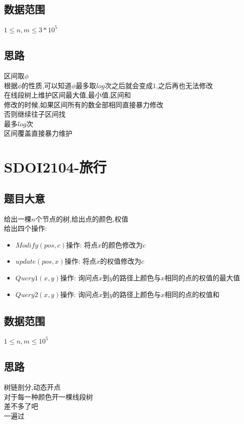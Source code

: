 \documentclass{ctexart}
\numberwithin{equation}{section}
\begin{document}
\begin{flushleft}
  \subsection{数据范围}
  $1\le n,m\le 3*10^5$\\
  \subsection{思路}
  区间取$\phi$\\
  根据$\phi$的性质,可以知道$\phi$最多取$log$次之后就会变成$1$,之后再也无法修改\\
  在线段树上维护区间最大值,最小值,区间和\\
  修改的时候,如果区间所有的数全部相同直接暴力修改\\
  否则继续往子区间找\\
  最多$log$次\\
  区间覆盖直接暴力维护\\
  \newpage

  \section{SDOI2104-旅行}
  \subsection{题目大意}
  给出一棵$n$个节点的树,给出点的颜色,权值\\
  给出四个操作:\\
  \begin{itemize}
  \item $Modify(pos,c)$操作: 将点$x$的颜色修改为$c$
  \item $update(pos,x)$操作: 将点$x$的权值修改为$c$
  \item $Query1(x,y)$操作: 询问点$x$到$y$的路径上颜色与$x$相同的点的权值的最大值
  \item $Query2(x,y)$操作: 询问点$x$到$y$的路径上颜色与$x$相同的点的权值和
  \end{itemize}
  \subsection{数据范围}
  $1\le n,m\le 10^5$\\
  \subsection{思路}
  树链剖分,动态开点\\
  对于每一种颜色开一棵线段树\\
  差不多了吧\\
  一遍过\\
  \newpage


\end{flushleft}
\end{document}
